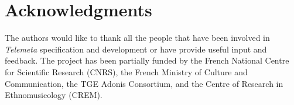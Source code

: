 \documentclass{aes53i}
\begin{document}
\section*{Acknowledgments} 
{\small The authors would like to thank all the people that have been involved in \emph{Telemeta} specification and development or have provide useful input and feedback. 
The project has been partially funded by the French National Centre for Scientific Research (CNRS), the French Ministry of Culture and Communication, the TGE Adonis Consortium, and the Centre of Research in Ethnomusicology (CREM).}




\end{document}
